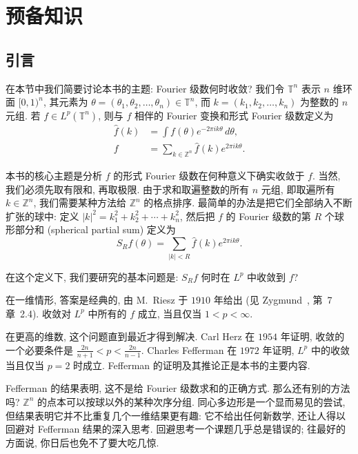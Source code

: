 \setcounter{chapter}{-1}
\chapter{预备知识}
\label{chap:0}

\section{引言}
\label{sec:0.1}

在本节中我们简要讨论本书的主题: Fourier 级数何时收敛? 我们令 $\mathbb{T}^n$ 表示 $n$ 维环面 $[0,1)^n$, 其元素为 $\theta=(\theta_1,\theta_2,\ldots,\theta_n)\in\mathbb{T}^n$, 而 $k=(k_1,k_2,\ldots,k_n)$ 为整数的 $n$ 元组. 若 $f\in L^p(\mathbb{T}^n)$, 则与 $f$ 相伴的 Fourier 变换和形式 Fourier 级数定义为
\begin{align*}
\hat{f}(k) &= \int f(\theta)e^{-2\pi ik\theta}\,d\theta, \\
f &= \sum_{k\in\mathbb{Z}^n}\hat{f}(k)e^{2\pi ik\theta}.
\end{align*}

本书的核心主题是分析 $f$ 的形式 Fourier 级数在何种意义下确实收敛于 $f$. 当然, 我们必须先取有限和, 再取极限. 由于求和取遍整数的所有 $n$ 元组, 即取遍所有 $k\in\mathbb{Z}^n$, 我们需要某种方法给 $\mathbb{Z}^n$ 的格点排序. 最简单的办法是把它们全部纳入不断扩张的球中: 定义 $|k|^2=k_1^2+k_2^2+\cdots+k_n^2$, 然后把 $f$ 的 Fourier 级数的第 $R$ 个球形部分和 (spherical partial sum) 定义为
\[
S_Rf(\theta)=\sum_{|k|<R}\hat{f}(k)e^{2\pi ik\theta}.
\]

在这个定义下, 我们要研究的基本问题是: $S_Rf$ 何时在 $L^p$ 中收敛到 $f$?

在一维情形, 答案是经典的, 由 M.~Riesz 于 $1910$ 年给出 (见 Zygmund~\cite{zygmund}, 第~7 章~2.4). 收敛对 $L^p$ 中所有的 $f$ 成立, 当且仅当 $1<p<\infty$.

在更高的维数, 这个问题直到最近才得到解决. Carl Herz 在 $1954$ 年证明, 收敛的一个必要条件是 $\frac{2n}{n+1}<p<\frac{2n}{n-1}$. Charles Fefferman 在 $1972$ 年证明, $L^p$ 中的收敛当且仅当 $p=2$ 时成立. Fefferman 的证明及其推论正是本书的主要内容.

Fefferman 的结果表明, 这不是给 Fourier 级数求和的正确方式. 那么还有别的方法吗? $\mathbb{Z}^n$ 的点本可以按球以外的某种次序分组. 同心多边形是一个显而易见的尝试, 但结果表明它并不比重复几个一维结果更有趣: 它不给出任何新数学, 还让人得以回避对 Fefferman 结果的深入思考. 回避思考一个课题几乎总是错误的; 往最好的方面说, 你日后也免不了要大吃几惊.


